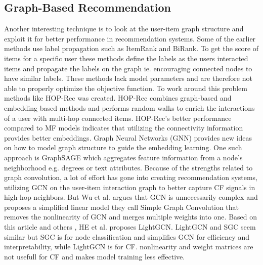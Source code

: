 \subsection{Graph-Based Recommendation}
Another interesting technique is to look at the user-item graph structure and exploit it for better performance in recommendation systems.
Some of the earlier methods use label propagation such as ItemRank\cite{ItemRank} and BiRank\cite{BiRank}.
To get the score of items for a specific user these methods define the labels as the users interacted items and propagate the labels on the graph ie. encouraging connected nodes to have similar labels.
These methods lack model parameters and are therefore not able to properly optimize the objective function\cite{NGCF_2019}.
To work around this problem methods like HOP-Rec \cite{HOP_Rec} was created.
HOP-Rec combines graph-based and embedding based methods and performs random walks to enrich the interactions of a user with multi-hop connected items.
HOP-Rec's better performance compared to MF models indicates that utilizing the connectivity information provides better embeddings.
Graph Neural Networks (GNN) provides new ideas on how to model graph structure to guide the embedding learning.
One such approach is GraphSAGE\cite{IND_REP_LEA} which aggregates feature information from a node's neighborhood e.g. degrees or text attributes.
Because of the strengths related to graph convolution, a lot of effort has gone into creating recommendation systems\cite{NGCF_2019,GC_MC,Priceaware}, utilizing GCN on the user-item interaction graph to better capture CF signals in high-hop neighbors.
But Wu et al. \cite{SGCN} argues that GCN is unnecessarily complex and proposes a simplified linear model they call Simple Graph Convolution that removes the nonlinearity of GCN and merges multiple weights into one.
Based on this article and others \cite{PRE_PROP,DEEP_GCN}, HE et al. \cite{lightgcn} proposes LightGCN.
LightGCN and SGC seem similar but SGC is for node classification and simplifies GCN for efficiency and interpretability, while LightGCN is for CF.
nonlinearity and weight matrices are not usefull for CF and makes model training less effective.
